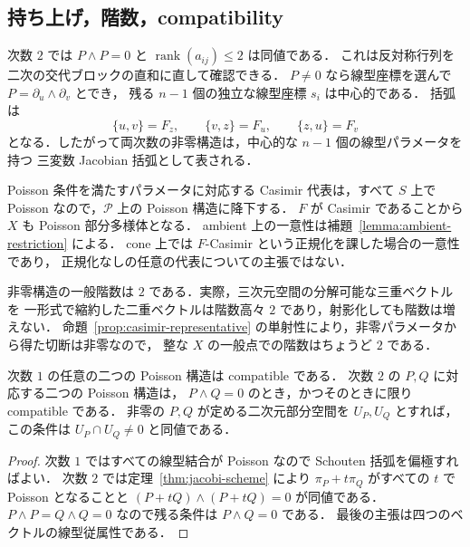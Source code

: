\subsection{持ち上げ，階数，compatibility}

次数 $2$ では $P\wedge P=0$ と $\operatorname{rank}(a_{ij})\leq2$ は同値である．
これは反対称行列を二次の交代ブロックの直和に直して確認できる．
$P\ne0$ なら線型座標を選んで $P=\partial_u\wedge\partial_v$ とでき，
残る $n-1$ 個の独立な線型座標 $s_i$ は中心的である．
括弧は
\[
 \{u,v\}=F_z,\qquad\{v,z\}=F_u,\qquad\{z,u\}=F_v
\]
となる．したがって両次数の非零構造は，中心的な $n-1$ 個の線型パラメータを持つ
三変数 Jacobian 括弧として表される．

Poisson 条件を満たすパラメータに対応する Casimir 代表は，すべて $S$ 上で Poisson なので，$\mathcal P$ 上の Poisson 構造に降下する．
$F$ が Casimir であることから $X$ も Poisson 部分多様体となる．
ambient 上の一意性は補題~\ref{lemma:ambient-restriction} による．
cone 上では $F$-Casimir という正規化を課した場合の一意性であり，
正規化なしの任意の代表についての主張ではない．

非零構造の一般階数は $2$ である．実際，三次元空間の分解可能な三重ベクトルを
一形式で縮約した二重ベクトルは階数高々 $2$ であり，射影化しても階数は増えない．
命題~\ref{prop:casimir-representative} の単射性により，非零パラメータから得た切断は非零なので，
整な $X$ の一般点での階数はちょうど $2$ である．

\begin{corollary}
\label{cor:compatibility}
次数 $1$ の任意の二つの Poisson 構造は compatible である．
次数 $2$ の $P,Q$ に対応する二つの Poisson 構造は，
$P\wedge Q=0$ のとき，かつそのときに限り compatible である．
非零の $P,Q$ が定める二次元部分空間を $U_P,U_Q$ とすれば，
この条件は $U_P\cap U_Q\ne0$ と同値である．
\end{corollary}

\begin{proof}
次数 $1$ ではすべての線型結合が Poisson なので Schouten 括弧を偏極すればよい．
次数 $2$ では定理~\ref{thm:jacobi-scheme} により
$\pi_P+t\pi_Q$ がすべての $t$ で Poisson となることと
$(P+tQ)\wedge(P+tQ)=0$ が同値である．
$P\wedge P=Q\wedge Q=0$ なので残る条件は $P\wedge Q=0$ である．
最後の主張は四つのベクトルの線型従属性である．
\end{proof}
